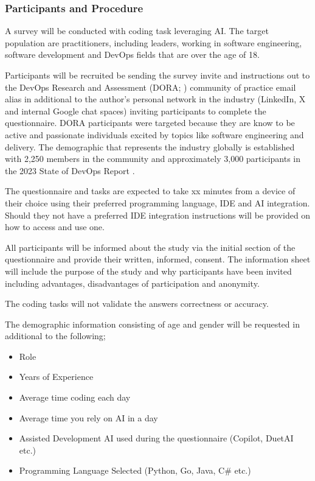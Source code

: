 \documentclass[man]{apa7}
\begin{document}
\subsubsection{Participants and Procedure}
A survey will be conducted with coding task leveraging AI. The target population are practitioners, including leaders, working in software engineering, software development and DevOps fields that are over the age of 18. 
 
Participants will be recruited be sending the survey invite and instructions out to the  DevOps Research and Assessment (DORA; \cite{Humble2018Accelerate:Organizations}) community of practice \parencite{DORACommunity} email alias in additional to the author's personal network in the industry (LinkedIn, X and internal Google chat spaces) inviting participants to complete the questionnaire. DORA participants were targeted because they are know to be active and passionate individuals excited by topics like software engineering and delivery. The demographic that represents the industry globally is established with 2,250 members in the community and approximately 3,000 participants in the 2023 State of DevOps Report \parencite{2023State2023}.

The questionnaire and tasks are expected to take xx minutes from a device of their choice using their preferred programming language, IDE and AI integration. Should they not have a preferred IDE integration instructions will be provided on how to access and use one.

All participants will be informed about the study via the initial section of the questionnaire and provide their written, informed, consent. The information sheet will include the purpose of the study and why participants have been invited including advantages, disadvantages of participation and anonymity. 

The coding tasks will not validate the answers correctness or accuracy.


The demographic information consisting of age and gender will be requested in additional to the following;

\begin{itemize}
    \item Role
    \item Years of Experience
    \item Average time coding each day
    \item Average time you rely on AI in a day
    \item Assisted Development AI used during the questionnaire (Copilot, DuetAI etc.)
    \item Programming Language Selected (Python, Go, Java, C\# etc.)
\end{itemize}
\end{document}
